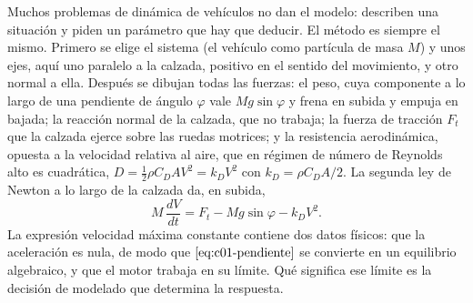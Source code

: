 \documentclass[10pt,openany]{book}
\begin{document}
Muchos problemas de dinámica de vehículos no dan el modelo: describen una situación y piden un parámetro que hay que deducir. El método es siempre el mismo. Primero se elige el sistema (el vehículo como partícula de masa \(M\)) y unos ejes, aquí uno paralelo a la calzada, positivo en el sentido del movimiento, y otro normal a ella. Después se dibujan todas las fuerzas: el peso, cuya componente a lo largo de una pendiente de ángulo \(\varphi\) vale \(Mg\sin\varphi\) y frena en subida y empuja en bajada; la reacción normal de la calzada, que no trabaja; la fuerza de tracción \(F_t\) que la calzada ejerce sobre las ruedas motrices; y la resistencia aerodinámica, opuesta a la velocidad relativa al aire, que en régimen de número de Reynolds alto es cuadrática, \(D = \tfrac12\rho C_D A V^{2} = k_D V^{2}\) con \(k_D = \rho C_D A/2\). La segunda ley de Newton a lo largo de la calzada da, en subida,
\begin{equation}
M\,\frac{dV}{dt} = F_t - Mg\sin\varphi - k_D V^{2}. \label{eq:c01-pendiente}
\end{equation}
La expresión velocidad máxima constante contiene dos datos físicos: que la aceleración es nula, de modo que \(\eqref{eq:c01-pendiente}\) se convierte en un equilibrio algebraico, y que el motor trabaja en su límite. Qué significa ese límite es la decisión de modelado que determina la respuesta.
\end{document}
